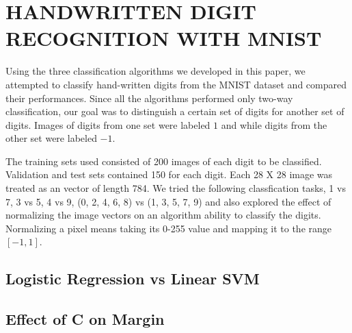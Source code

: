 \documentclass[10pt,twoside]{article}
\begin{document}
\section{\uppercase{Handwritten Digit Recognition with MNIST}}
Using the three classification algorithms we developed in this paper, we attempted to classify hand-written digits from the MNIST dataset and compared their performances. Since all the algorithms performed only two-way classification, our goal was to distinguish a certain set of digits for another set of digits. Images of digits from one set were labeled $1$ and while digits from the other set were labeled $-1$.

The training sets used consisted of 200 images of each digit to be classified. Validation and test sets contained 150 for each digit. Each 28 X 28 image was treated as an vector of length 784. We tried the following classfication tasks,  1 vs 7, 3 vs 5, 4 vs 9, (0, 2, 4, 6, 8) vs (1, 3, 5, 7, 9) and also explored the effect of normalizing the image vectors on an algorithm ability to classify the digits. Normalizing a pixel means taking its 0-255 value and mapping it to the range $[-1,1]$. 

\subsection{Logistic Regression vs Linear SVM}

\subsection{Effect of C on Margin}

\vfill
\end{document}
